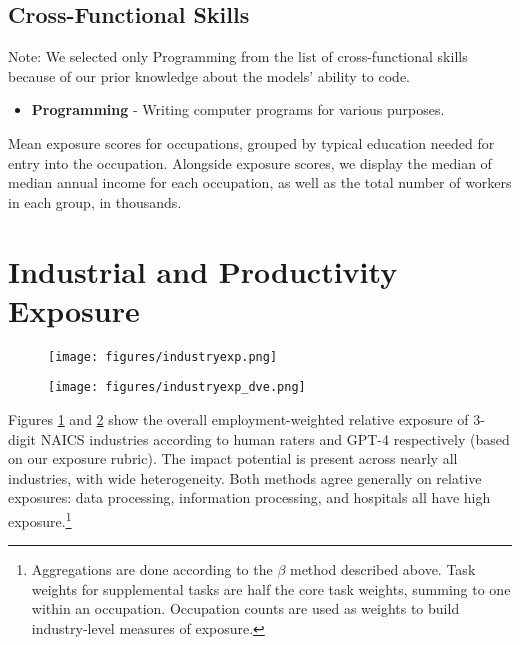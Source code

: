 \documentclass[11pt]{article}
\begin{document}
\subsection*{Cross-Functional Skills}
Note: We selected only Programming from the list of cross-functional skills because of our prior knowledge about the models' ability to code.
\begin{itemize}
    \item \textbf{Programming} - Writing computer programs for various purposes.
\end{itemize}

\begin{comment}
\section{Education}
\label{subsec:educ_appendix}
\end{comment}

\begin{table}[h]
    \centering
    
    \caption{Mean exposure scores for occupations, grouped by typical education needed for entry into the occupation. Alongside exposure scores, we display the median of median annual income for each occupation, as well as the total number of workers in each group, in thousands.}
    \label{tab:education}
\end{table}

\section{Industrial and Productivity Exposure}
\label{subsec:aggregates}

\begin{figure}[p]
\centering
\texttt{[image: figures/industryexp.png]}
\caption{}
\label{fig:meanhuman_indexp}
\end{figure}

\begin{figure}[p]
\centering
\texttt{[image: figures/industryexp\_dve.png]}
\caption{}
\label{fig:dve_indexp}
\end{figure}

Figures \ref{fig:meanhuman_indexp} and \ref{fig:dve_indexp} show the overall employment-weighted relative exposure of 3-digit NAICS industries according to human raters and GPT-4 respectively (based on our exposure rubric). The impact potential is present across nearly all industries, with wide heterogeneity. Both methods agree generally on relative exposures: data processing, information processing, and hospitals all have high exposure.\footnote{Aggregations are done according to the $\beta$ method described above. Task weights for supplemental tasks are half the core task weights, summing to one within an occupation. Occupation counts are used as weights to build industry-level measures of exposure.}
\end{document}
